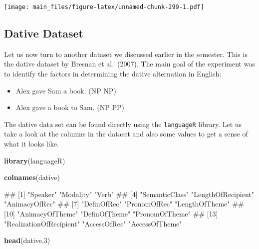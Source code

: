 \documentclass[
]{book}
\newenvironment{Shaded}{\begin{snugshade}}{\end{snugshade}}
\newcommand{\DecValTok}[1]{\textcolor[rgb]{0.00,0.00,0.81}{#1}}
\newcommand{\FunctionTok}[1]{\textcolor[rgb]{0.13,0.29,0.53}{\textbf{#1}}}
\newcommand{\NormalTok}[1]{#1}
\providecommand{\tightlist}{%
  \setlength{\itemsep}{0pt}\setlength{\parskip}{0pt}}
\begin{document}
\texttt{[image: main\_files/figure-latex/unnamed-chunk-299-1.pdf]}

\subsection{Dative Dataset}\label{dative-dataset}

Let us now turn to another dataset we discussed earlier in the semester. This is the dative dataset by Bresnan et al.~(2007). The main goal of the experiment was to identify the factors in determining the dative alternation in English:

\begin{itemize}
\tightlist
\item
  Alex gave Sam a book. (NP NP)
\item
  Alex gave a book to Sam. (NP PP)
\end{itemize}

The dative data set can be found directly using the \texttt{languageR} library. Let us take a look at the columns in the dataset and also some values to get a sense of what it looks like.

\begin{Shaded}
\begin{Highlighting}[]
\FunctionTok{library}\NormalTok{(languageR)}

\FunctionTok{colnames}\NormalTok{(dative)}
\end{Highlighting}
\end{Shaded}

\begin{Shaded}
\begin{Highlighting}[]
\NormalTok{\#\#  [1] "Speaker"                "Modality"               "Verb"                  }
\NormalTok{\#\#  [4] "SemanticClass"          "LengthOfRecipient"      "AnimacyOfRec"          }
\NormalTok{\#\#  [7] "DefinOfRec"             "PronomOfRec"            "LengthOfTheme"         }
\NormalTok{\#\# [10] "AnimacyOfTheme"         "DefinOfTheme"           "PronomOfTheme"         }
\NormalTok{\#\# [13] "RealizationOfRecipient" "AccessOfRec"            "AccessOfTheme"}
\end{Highlighting}
\end{Shaded}

\begin{Shaded}
\begin{Highlighting}[]
\FunctionTok{head}\NormalTok{(dative,}\DecValTok{3}\NormalTok{)}
\end{Highlighting}
\end{Shaded}
\end{document}
